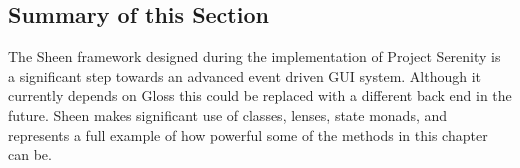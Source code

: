 \subsection{Summary of this Section}

The Sheen framework designed during the implementation of Project Serenity is a significant step towards an advanced event driven GUI system. Although it currently depends on Gloss this could be replaced with a different back end in the future. Sheen makes significant use of classes, lenses, state monads, and represents a full example of how powerful some of the methods in this chapter can be.

